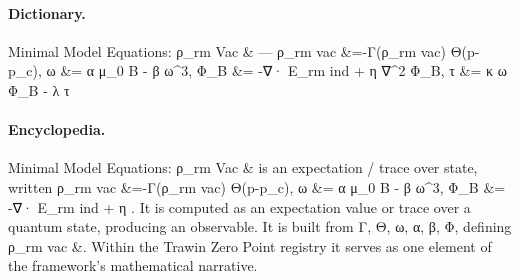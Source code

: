 \paragraph{Dictionary.}
Minimal Model Equations: ρ\_rm Vac \& — ρ\_rm vac \&=-Γ(ρ\_rm vac) Θ(p-p\_c), ω \&= α μ\_0 B - β ω\textasciicircum{}3, Φ\_B \&= -∇· E\_rm ind + η ∇\textasciicircum{}2 Φ\_B, τ \&= κ ω Φ\_B - λ τ

\paragraph{Encyclopedia.}
Minimal Model Equations: ρ\_rm Vac \& is an expectation / trace over state, written ρ\_rm vac \&=-Γ(ρ\_rm vac) Θ(p-p\_c), ω \&= α μ\_0 B - β ω\textasciicircum{}3, Φ\_B \&= -∇· E\_rm ind + η . It is computed as an expectation value or trace over a quantum state, producing an observable. It is built from Γ, Θ, ω, α, β, Φ, defining ρ\_rm vac \&. Within the Trawin Zero Point registry it serves as one element of the framework's mathematical narrative.
